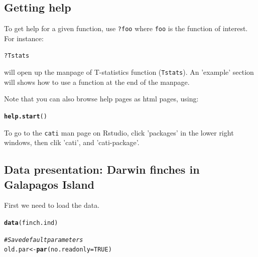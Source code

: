 \documentclass[12pt]{article}\usepackage[]{graphicx}\usepackage[]{color}
\makeatletter
\newcommand{\hlnum}[1]{\textcolor[rgb]{0.686,0.059,0.569}{#1}}%
\newcommand{\hlcom}[1]{\textcolor[rgb]{0.678,0.584,0.686}{\textit{#1}}}%
\newcommand{\hlopt}[1]{\textcolor[rgb]{0,0,0}{#1}}%
\newcommand{\hlstd}[1]{\textcolor[rgb]{0.345,0.345,0.345}{#1}}%
\newcommand{\hlkwb}[1]{\textcolor[rgb]{0.69,0.353,0.396}{#1}}%
\newcommand{\hlkwc}[1]{\textcolor[rgb]{0.333,0.667,0.333}{#1}}%
\newcommand{\hlkwd}[1]{\textcolor[rgb]{0.737,0.353,0.396}{\textbf{#1}}}%
\newenvironment{kframe}{%
 \def\at@end@of@kframe{}%
 \ifinner\ifhmode%
  \def\at@end@of@kframe{\end{minipage}}%
  \begin{minipage}{\columnwidth}%
 \fi\fi%
 \def\FrameCommand##1{\hskip\@totalleftmargin \hskip-\fboxsep
 \colorbox{shadecolor}{##1}\hskip-\fboxsep
     \hskip-\linewidth \hskip-\@totalleftmargin \hskip\columnwidth}%
 \MakeFramed {\advance\hsize-\width
   \@totalleftmargin\z@ \linewidth\hsize
   \@setminipage}}%
 {\par\unskip\endMakeFramed%
 \at@end@of@kframe}
\newenvironment{knitrout}{}{} %
\makeatother
\begin{document}
\subsection{Getting help}

To get help for a given function, use \texttt{?foo} where \texttt{foo} is the
function of interest.
For instance:

\begin{knitrout}
\color{fgcolor}\begin{kframe}
\begin{alltt}
\hlopt{?}\hlstd{Tstats}
\end{alltt}
\end{kframe}
\end{knitrout}

will open up the manpage of T-statistics function (\texttt{Tstats}).
An 'example' section will shows how to use a function at the end of the manpage. 

Note that you can also browse help pages as html pages, using:
\begin{knitrout}
\color{fgcolor}\begin{kframe}
\begin{alltt}
\hlkwd{help.start}\hlstd{()}
\end{alltt}
\end{kframe}
\end{knitrout}

To go to the \texttt{cati} man page on Rstudio, click 'packages' in the lower right windows, then clik 'cati', and 'cati-package'.

\subsection{Data presentation: Darwin finches in Galapagos Island}

First we need to load the data.
\begin{knitrout}
\color{fgcolor}\begin{kframe}
\begin{alltt}
\hlkwd{data}\hlstd{(finch.ind)}

\hlcom{#Save default parameters}
\hlstd{old.par}\hlkwb{<-}\hlkwd{par}\hlstd{(}\hlkwc{no.readonly} \hlstd{=} \hlnum{TRUE}\hlstd{)}
\end{alltt}
\end{kframe}
\end{knitrout}
\end{document}
